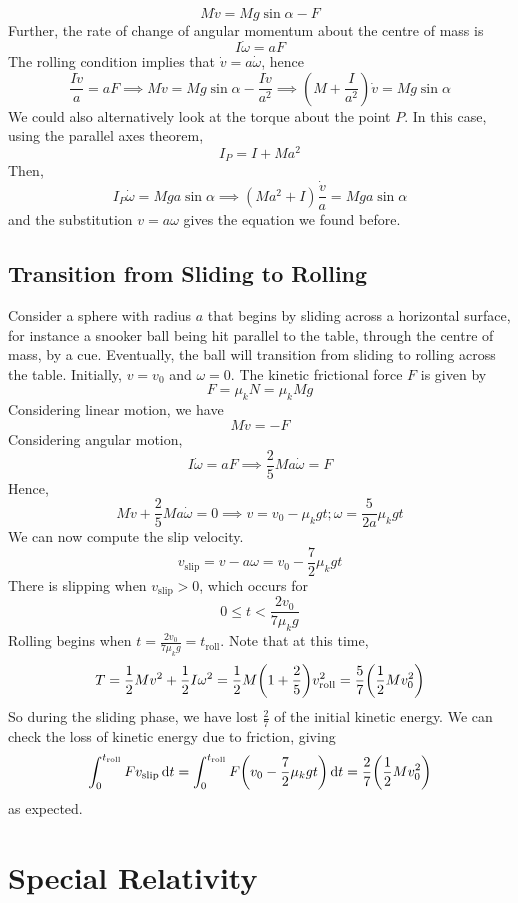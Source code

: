 \documentclass{article}
\begin{document}
\[ M\dot v = Mg\sin\alpha - F \]
Further, the rate of change of angular momentum about the centre of mass is
\[ I \dot\omega = aF \]
The rolling condition implies that $\dot v = a \dot\omega$, hence
\[ \frac{I\dot v}{a} = aF \implies M\dot v = Mg\sin\alpha - \frac{I\dot v}{a^2} \implies \left( M + \frac{I}{a^2} \right)\dot v = Mg\sin\alpha \]
We could also alternatively look at the torque about the point $P$. In this case, using the parallel axes theorem,
\[ I_P = I + Ma^2 \]
Then,
\[ I_P \dot\omega = Mga\sin\alpha \implies (M a^2 + I)\frac{\dot v}{a} = Mga\sin\alpha \]
and the substitution $v = a\omega$ gives the equation we found before.

\subsection{Transition from Sliding to Rolling}
Consider a sphere with radius $a$ that begins by sliding across a horizontal surface, for instance a snooker ball being hit parallel to the table, through the centre of mass, by a cue. Eventually, the ball will transition from sliding to rolling across the table. Initially, $v = v_0$ and $\omega = 0$. The kinetic frictional force $F$ is given by
\[ F = \mu_k N = \mu_k Mg \]
Considering linear motion, we have
\[ M \dot v = -F \]
Considering angular motion,
\[ I\dot\omega = aF \implies \frac{2}{5}Ma \dot\omega = F \]
Hence,
\[ M\dot v +\frac{2}{5}Ma \dot\omega = 0 \implies v = v_0 - \mu_k g t; \omega = \frac{5}{2a}\mu_k g t \]
We can now compute the slip velocity.
\[ v_\text{slip} = v - a\omega = v_0 - \frac{7}{2}\mu_k gt \]
There is slipping when $v_\text{slip} > 0$, which occurs for
\[ 0 \leq t < \frac{2v_0}{7\mu_k g} \]
Rolling begins when $t = \frac{2v_0}{7\mu_k g} = t_\text{roll}$. Note that at this time,
\[ T = \frac{1}{2}Mv^2 + \frac{1}{2}I\omega^2 = \frac{1}{2}M\qty(1 + \frac{2}{5})v_\text{roll}^2 = \frac{5}{7}\qty( \frac{1}{2} Mv_0^2 ) \]
So during the sliding phase, we have lost $\frac{2}{7}$ of the initial kinetic energy. We can check the loss of kinetic energy due to friction, giving
\[ \int_0^{t_\text{roll}} F v_\text{slip} \dd{t} = \int_0^{t_\text{roll}} F \qty(v_0 - \frac{7}{2}\mu_k gt) \dd{t} = \frac{2}{7}\qty(\frac{1}{2}Mv_0^2) \]
as expected.

\section{Special Relativity}
\end{document}

